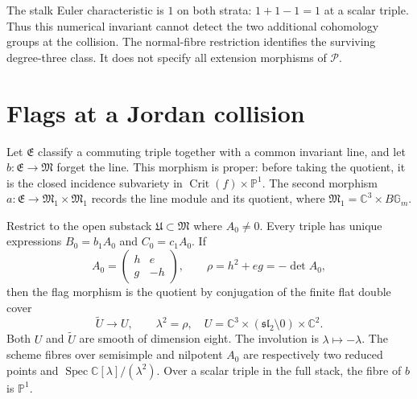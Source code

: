 The stalk Euler characteristic is $1$ on both strata:
$1+1-1=1$ at a scalar triple. Thus this numerical invariant cannot
detect the two additional cohomology groups at the collision.
The normal-fibre restriction identifies the surviving degree-three
class. It does not specify all extension morphisms of $\mathcal P$.

\section{Flags at a Jordan collision}
\label{sec:c3-collision-flags}

Let $\mathfrak E$ classify a commuting triple together with a common
invariant line, and let $b:\mathfrak E\to\mathfrak M$ forget the line.
This morphism is proper: before taking the quotient, it is the
closed incidence subvariety in
$\operatorname{Crit}(f)\times\mathbb P^1$.
The second morphism $a:\mathfrak E\to\mathfrak M_1\times\mathfrak M_1$
records the line module and its quotient, where
$\mathfrak M_1=\mathbb C^3\times B\mathbb G_m$.

\begin{proposition}
\label{prop:c3-collision-ramified}
Restrict to the open substack $\mathfrak U\subset\mathfrak M$ where
$A_0\ne0$. Every triple has unique expressions
$B_0=b_1A_0$ and $C_0=c_1A_0$.
If
\[
 A_0=\begin{pmatrix}h&e\\g&-h\end{pmatrix},\qquad
 \rho=h^2+eg=-\det A_0,
\]
then the flag morphism is the quotient by conjugation of the finite
flat double cover
\begin{equation}
 \widetilde U\longrightarrow U,
 \qquad \lambda^2=\rho,
 \quad U=\mathbb C^3\times
 (\mathfrak{sl}_2\setminus0)\times\mathbb C^2.
 \label{eq:c3-collision-double-cover}
\end{equation}
Both $U$ and $\widetilde U$ are smooth of dimension eight.
The involution is $\lambda\mapsto-\lambda$.
The scheme fibres over semisimple and nilpotent $A_0$ are respectively
two reduced points and $\operatorname{Spec}\mathbb C[\lambda]/(\lambda^2)$.
Over a scalar triple in the full stack, the fibre of $b$ is $\mathbb P^1$.
\end{proposition}

